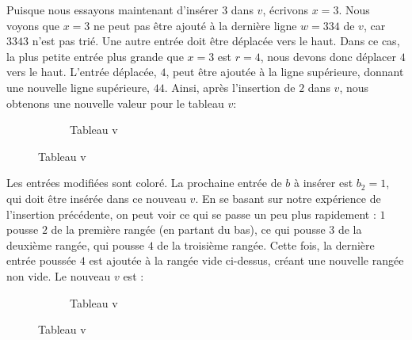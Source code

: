 Puisque nous essayons maintenant d'insérer 3 dans $v$, écrivons $x = 3$. 
Nous voyons que $x = 3$ ne peut pas être ajouté à la dernière ligne $w = 334$ de $v$, car $3343$ n'est pas trié. 
Une autre entrée doit être déplacée vers le haut. 
Dans ce cas, la plus petite entrée plus grande que $x = 3$ est $r = 4$, nous devons donc déplacer $4$ vers le haut. 
L'entrée déplacée, $4$, peut être ajoutée à la ligne supérieure, donnant une nouvelle ligne supérieure, $44$. 
Ainsi, après l'insertion de $2$ dans $v$, nous obtenons une nouvelle valeur pour le tableau $v$:
\begin{figure}[!ht]
	\centering
	\begin{subfigure}[b]{0.4\linewidth}
		\centering
		\caption{Tableau v}
		\label{fig:tab11}
	\end{subfigure}
	\label{fig:tabs6}
\end{figure}
Les entrées modifiées sont coloré. La prochaine entrée de $b$ à insérer est $b_2 = 1$, qui doit être insérée dans ce nouveau $v$. 
En se basant sur notre expérience de l'insertion précédente, on peut voir ce qui se passe un peu plus rapidement : $1$ pousse $2$ de la première rangée (en partant du bas), ce qui pousse $3$ de la deuxième rangée, qui pousse $4$ de la troisième rangée. Cette fois, la dernière entrée poussée $4$ est ajoutée à la rangée vide ci-dessus, créant une nouvelle rangée non vide. Le nouveau $v$ est :
 \begin{figure}[!ht]
	\centering
	\begin{subfigure}[b]{0.4\linewidth}
		\centering
		\caption{Tableau v}
		\label{fig:tab12}
	\end{subfigure}
	\label{fig:tabs7}
\end{figure}
